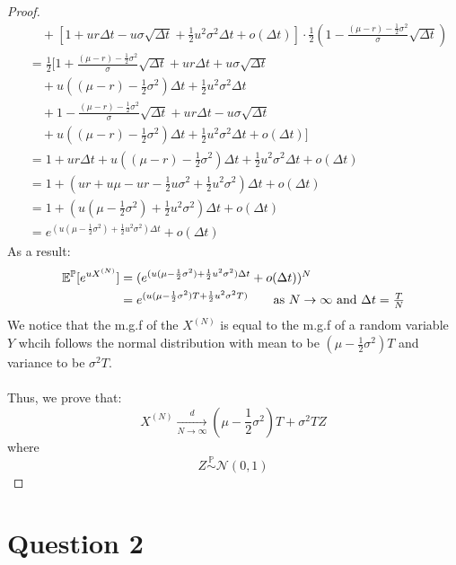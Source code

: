 \documentclass[12pt, letterpaper]{article}
\begin{document}
\begin{proof}
\begin{align*}
    & \quad + [1+u r\Delta t-u \sigma \sqrt{\Delta t} +\frac{1}{2}u^2\sigma^2\Delta t + o(\Delta t)] \cdot \frac{1}{2} (1 - \frac{(\mu -r) - \frac{1}{2}\sigma^2}{\sigma} \sqrt{\Delta t}) \\
    &= \frac{1}{2}[ 1 + \frac{(\mu - r) - \frac{1}{2}\sigma^2}{\sigma}\sqrt{\Delta t} + u r \Delta t + u \sigma \sqrt{\Delta t} \\
    & \quad + u((\mu -r) - \frac{1}{2}\sigma^2)\Delta t + \frac{1}{2}u^2 \sigma^2 \Delta t \\
    & \quad + 1 - \frac{(\mu - r) - \frac{1}{2}\sigma^2}{\sigma}\sqrt{\Delta t} + ur \Delta t - u\sigma \sqrt{\Delta t} \\
    & \quad + u((\mu -r) - \frac{1}{2}\sigma^2)\Delta t + \frac{1}{2}u^2 \sigma^2 \Delta t + o(\Delta t)] \\
    &= 1 + ur \Delta t + u((\mu - r) - \frac{1}{2}\sigma^2)\Delta t + \frac{1}{2}u^2 \sigma^2 \Delta t + o(\Delta t) \\
    &= 1 + (ur + u\mu - ur -\frac{1}{2}u \sigma^2 + \frac{1}{2}u^2 \sigma^2)\Delta t + o(\Delta t) \\
    &= 1 + (u (\mu - \frac{1}{2}\sigma^2) + \frac{1}{2}u^2 \sigma^2)\Delta t + o(\Delta t)\\
    &= e^{(u (\mu - \frac{1}{2}\sigma^2) + \frac{1}{2}u^2 \sigma^2)\Delta t} + o(\Delta t)
\end{align*} 
As a result:
\begin{align*}
  \mathbb{E}^\mathbb{P}[e^{u X^{(N)}}] & = (e^{(u (\mu - \frac{1}{2}\sigma^2) + \frac{1}{2}u^2 \sigma^2)\Delta t} + o(\Delta t))^N\\
    &=  e^{(u(\mu - \frac{1}{2}\sigma^2)T + \frac{1}{2}u^2 \sigma^2T)} \tag*{as $N \rightarrow \infty$ and $\Delta t = \frac{T}{N}$}
\end{align*}
We notice that the m.g.f of the $X^{(N)}$ is equal to the m.g.f of a random variable $Y$ whcih follows the normal distribution with mean to be $(\mu - \frac{1}{2}\sigma^2)T$ and
variance to be $\sigma^2 T$.
\\ \\
Thus, we prove that:
\[X^{(N)} \xrightarrow[N \rightarrow \infty]{d} (\mu - \frac{1}{2}\sigma^2)T + \sigma^2 TZ\]
where 
\[Z \stackrel{\mathbb{P}}{\sim} \mathcal{N}(0, 1)\] 
\end{proof}

\part*{Question 2}
\end{document}
